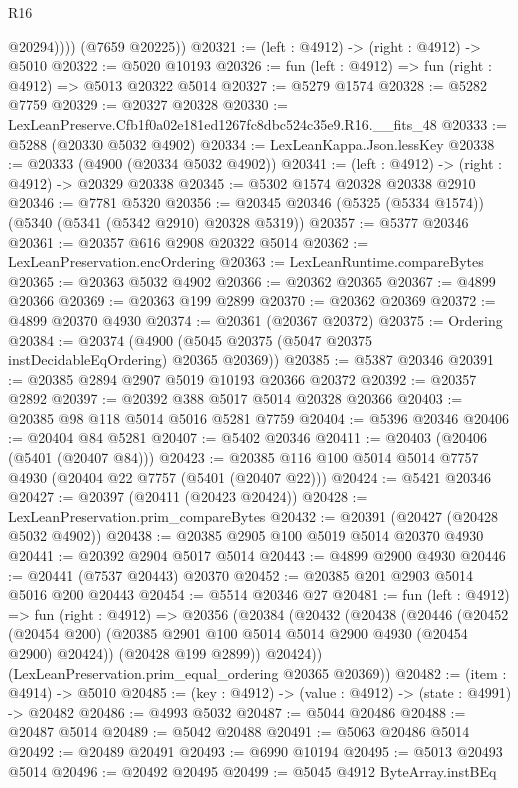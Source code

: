 \begin{lexlean}{R16}
\begin{coremodule}
              @20294))))
      (@7659 @20225))
@20321 := (left : @4912) -> (right : @4912) -> @5010
@20322 := @5020 @10193
@20326 := fun (left : @4912) => fun (right : @4912) => @5013 @20322 @5014
@20327 := @5279 @1574
@20328 := @5282 @7759
@20329 := @20327 @20328
@20330 := LexLeanPreserve.Cfb1f0a02e181ed1267fc8dbc524c35e9.R16.__fits_48
@20333 := @5288 (@20330 @5032 @4902)
@20334 := LexLeanKappa.Json.lessKey
@20338 := @20333 (@4900 (@20334 @5032 @4902))
@20341 := (left : @4912) -> (right : @4912) -> @20329 @20338
@20345 := @5302 @1574 @20328 @20338 @2910
@20346 := @7781 @5320
@20356 := @20345 @20346 (@5325 (@5334 @1574)) (@5340 (@5341 (@5342 @2910) @20328 @5319))
@20357 := @5377 @20346
@20361 := @20357 @616 @2908 @20322 @5014
@20362 := LexLeanPreservation.encOrdering
@20363 := LexLeanRuntime.compareBytes
@20365 := @20363 @5032 @4902
@20366 := @20362 @20365
@20367 := @4899 @20366
@20369 := @20363 @199 @2899
@20370 := @20362 @20369
@20372 := @4899 @20370 @4930
@20374 := @20361 (@20367 @20372)
@20375 := Ordering
@20384 := @20374 (@4900 (@5045 @20375 (@5047 @20375 instDecidableEqOrdering) @20365 @20369))
@20385 := @5387 @20346
@20391 := @20385 @2894 @2907 @5019 @10193 @20366 @20372
@20392 := @20357 @2892
@20397 := @20392 @388 @5017 @5014 @20328 @20366
@20403 := @20385 @98 @118 @5014 @5016 @5281 @7759
@20404 := @5396 @20346
@20406 := @20404 @84 @5281
@20407 := @5402 @20346
@20411 := @20403 (@20406 (@5401 (@20407 @84)))
@20423 := @20385 @116 @100 @5014 @5014 @7757 @4930 (@20404 @22 @7757 (@5401 (@20407 @22)))
@20424 := @5421 @20346
@20427 := @20397 (@20411 (@20423 @20424))
@20428 := LexLeanPreservation.prim_compareBytes
@20432 := @20391 (@20427 (@20428 @5032 @4902))
@20438 := @20385 @2905 @100 @5019 @5014 @20370 @4930
@20441 := @20392 @2904 @5017 @5014
@20443 := @4899 @2900 @4930
@20446 := @20441 (@7537 @20443) @20370
@20452 := @20385 @201 @2903 @5014 @5016 @200 @20443
@20454 := @5514 @20346 @27
@20481 := fun (left : @4912) =>
  fun (right : @4912) =>
  @20356
    (@20384
      (@20432
        (@20438
          (@20446
            (@20452 (@20454 @200) (@20385 @2901 @100 @5014 @5014 @2900 @4930 (@20454 @2900) @20424))
            (@20428 @199 @2899))
          @20424))
      (LexLeanPreservation.prim_equal_ordering @20365 @20369))
@20482 := (item : @4914) -> @5010
@20485 := (key : @4912) -> (value : @4912) -> (state : @4991) -> @20482
@20486 := @4993 @5032
@20487 := @5044 @20486
@20488 := @20487 @5014
@20489 := @5042 @20488
@20491 := @5063 @20486 @5014
@20492 := @20489 @20491
@20493 := @6990 @10194
@20495 := @5013 @20493 @5014
@20496 := @20492 @20495
@20499 := @5045 @4912 ByteArray.instBEq

\end{coremodule}
\end{lexlean}
